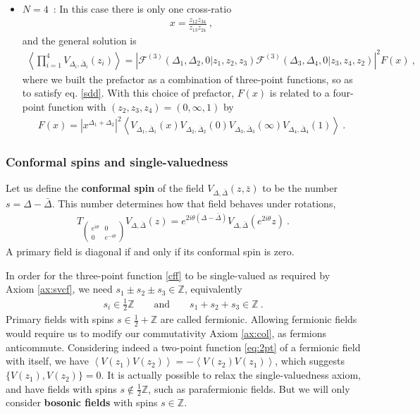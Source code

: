 \documentclass[12pt, a4paper, notitlepage, twoside]{report}
\numberwithin{equation}{section}
\theoremstyle{break}
\begin{document}
\begin{itemize}
\item $\boxed{N=4}$\ : In this case there is only one cross-ratio 
\begin{align}
 x=\frac{z_{12}z_{34}}{z_{13}z_{24}}\ ,
\label{xe}
\end{align}
and the general solution is 
\begin{align}
 \left\langle\prod_{i=1}^4 V_{\Delta_i,\bar\Delta_i}(z_i)\right\rangle = \left|\mathcal{F}^{(3)}(\Delta_1,\Delta_2,0|z_1,z_2,z_3) \mathcal{F}^{(3)}(\Delta_3,\Delta_4,0|z_3,z_4,z_2)\right|^2 F(x)\ ,
\label{zgg}
\end{align}
where we built the prefactor as a combination of three-point functions, so as to satisfy eq. \eqref{sdd}.
With this choice of prefactor, $F(x)$ is related to a four-point function with $(z_2,z_3,z_4)=(0,\infty,1)$ by
\begin{align}
 F(x) =\left| x^{\Delta_1+\Delta_2} \right|^2 \left\langle V_{\Delta_1,\bar\Delta_1}(x)V_{\Delta_2,\bar\Delta_2}(0)V_{\Delta_3,\bar\Delta_3}(\infty) V_{\Delta_4,\bar\Delta_4}(1)\right\rangle \ .
\label{fx}
\end{align}
\end{itemize}

\subsubsection{Conformal spins and single-valuedness}

Let us define the \textbf{conformal spin} of the field $V_{\Delta,\bar\Delta}(z,\bar z)$ to be the number $s=\Delta-\bar\Delta$. This number determines how that field behaves under rotations, 
\begin{align}
 T_{\left(\begin{smallmatrix} e^{i\theta} & 0 \\ 0 & e^{-i\theta} \end{smallmatrix}\right)} V_{\Delta,\bar{\Delta}}(z) = e^{2i\theta(\Delta-\bar\Delta)} V_{\Delta,\bar{\Delta}}(e^{2i\theta} z)\ .
\end{align}
A primary field is diagonal if and only if its conformal spin is zero.

In order for the three-point function \eqref{cff} to be single-valued as required by Axiom \ref{ax:svcf}, we need $s_1\pm s_2\pm s_3 \in\mathbb{Z}$, equivalently
\begin{align}
 \boxed{s_i \in \frac12{\mathbb{Z}} \qquad \text{and} \qquad s_1+s_2+s_3\in\mathbb{Z}}\ .
\label{dbdz}
\end{align}
Primary fields with spins $s\in\frac12+\mathbb{Z}$ are called fermionic. Allowing fermionic fields would require us to modify our commutativity Axiom \ref{ax:col}, as fermions anticommute. Considering indeed a two-point function \eqref{eq:2pt} of a fermionic field with itself, we have $\left< V(z_1)V(z_2)\right> = -\left<V(z_2)V(z_1)\right>$, which suggests $\{V(z_1),V(z_2)\}=0$.
It is actually possible to relax the single-valuedness axiom, and have fields with spins $s\notin \frac12\mathbb{Z}$, such as parafermionic fields. But we will only consider \textbf{bosonic fields} with spins $s\in\mathbb{Z}$.
\end{document}
